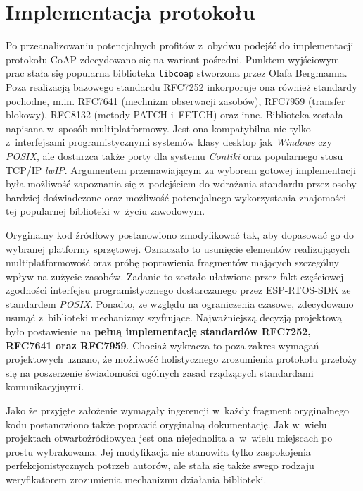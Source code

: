 \section{Implementacja protokołu}

Po przeanalizowaniu potencjalnych profitów z~obydwu podejść do implementacji protokołu CoAP zdecydowano się na wariant pośredni. Punktem wyjściowym prac stała się popularna biblioteka \verb|libcoap| \cite{libcoap} stworzona przez Olafa Bergmanna. Poza realizacją bazowego standardu RFC7252 inkorporuje ona również standardy pochodne, m.in. RFC7641 (mechnizm obserwacji zasobów), RFC7959 (transfer blokowy), RFC8132 (metody PATCH i~FETCH) oraz inne. Biblioteka została napisana w~sposób multiplatformowy. Jest ona kompatybilna nie tylko z~interfejsami programistycznymi systemów klasy desktop jak \textit{Windows} czy \textit{POSIX}, ale dostarzca także porty dla systemu \textit{Contiki} oraz popularnego stosu TCP/IP \textit{lwIP}. Argumentem przemawiającym za wyborem gotowej implementacji była możliwość zapoznania się z~podejściem do wdrażania standardu przez osoby bardziej doświadczone oraz możliwość potencjalnego wykorzystania znajomości tej popularnej biblioteki w~życiu zawodowym.

Oryginalny kod źródłowy postanowiono zmodyfikować tak, aby dopasować go do wybranej platformy sprzętowej. Oznaczało to usunięcie elementów realizujących multiplatformowość oraz próbę poprawienia fragmentów mających szczególny wpływ na zużycie zasobów. Zadanie to zostało ułatwione przez fakt częściowej zgodności interfejsu programistycznego dostarczanego przez ESP-RTOS-SDK ze standardem \textit{POSIX}. Ponadto, ze względu na ograniczenia czasowe, zdecydowano usunąć z~biblioteki mechanizmy szyfrujące. Najważniejszą decyzją projektową było postawienie na \textbf{pełną implementację standardów RFC7252, RFC7641 oraz RFC7959}. Chociaż wykracza to poza zakres wymagań projektowych uznano, że możliwość holistycznego zrozumienia protokołu przełoży się na poszerzenie świadomości ogólnych zasad rządzących standardami komunikacyjnymi.

Jako że przyjęte założenie wymagały ingerencji w~każdy fragment oryginalnego kodu postanowiono także poprawić oryginalną dokumentację. Jak w~wielu projektach otwartoźródłowych jest ona niejednolita a~w~wielu miejscach po prostu wybrakowana. Jej modyfikacja nie stanowiła tylko zaspokojenia perfekcjonistycznych potrzeb autorów, ale stała się także swego rodzaju weryfikatorem zrozumienia mechanizmu działania biblioteki.


